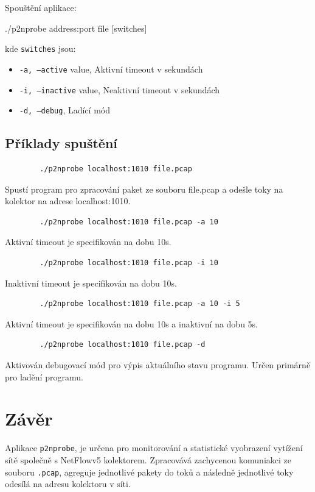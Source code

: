 \documentclass[11pt, a4paper, hidelinks]{article}[08.10.2023]
\begin{document}
    Spouštění aplikace:

    \begin{center}
            ./p2nprobe address:port file [switches]
    \end{center}

    kde \texttt{switches} jsou:
    \begin{itemize}
        \item{\texttt{-a, --active} value, Aktivní timeout v sekundách}
        \item{\texttt{-i, --inactive} value, Neaktivní timeout v sekundách}
        \item{\texttt{-d, --debug},  Ladící mód}
    \end{itemize}

    \subsection{Příklady spuštění}
    \begin{lstlisting}
        ./p2nprobe localhost:1010 file.pcap
    \end{lstlisting}
    Spustí program pro zpracování paket ze souboru file.pcap a odešle toky na kolektor na adrese localhost:1010.

    \begin{lstlisting}
        ./p2nprobe localhost:1010 file.pcap -a 10
    \end{lstlisting}
    Aktivní timeout je specifikován na dobu 10s.
    
    \begin{lstlisting}
        ./p2nprobe localhost:1010 file.pcap -i 10
    \end{lstlisting} 
    Inaktivní timeout je specifikován na dobu 10s.

    \begin{lstlisting}
        ./p2nprobe localhost:1010 file.pcap -a 10 -i 5
    \end{lstlisting}
    Aktivní timeout je specifikován na dobu 10s a inaktivní na dobu 5s.

    \begin{lstlisting}
        ./p2nprobe localhost:1010 file.pcap -d
    \end{lstlisting}
    Aktivován debugovací mód pro výpis aktuálního stavu programu. Určen primárně pro ladění programu.

    \section{Závěr}
    Aplikace \texttt{p2nprobe}, je určena pro monitorování a statistické vyobrazení vytížení sítě společně s NetFlowv5 kolektorem. Zpracovává zachycenou komuniakci ze souboru \texttt{.pcap}, agreguje jednotlivé pakety do toků a následně jednotlivé toky odesílá na adresu kolektoru v síti.
\end{document}

